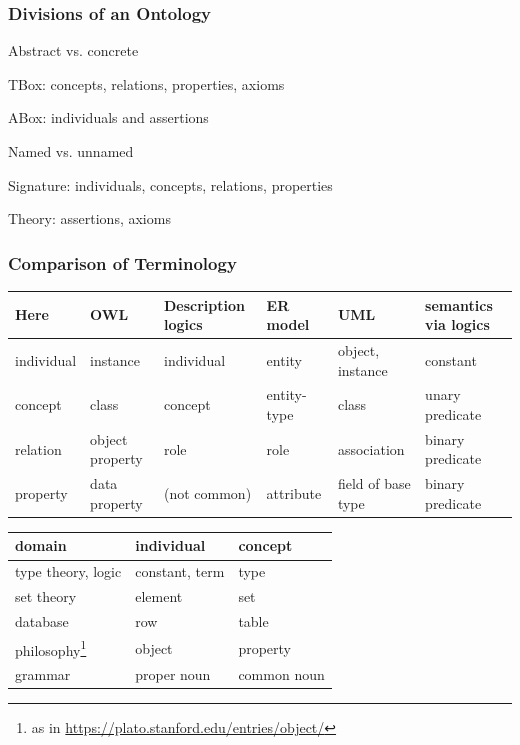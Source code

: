 \documentclass{beamer}
\begin{document}
\begin{frame}\frametitle{Divisions of an Ontology}
\begin{blockitems}{Abstract vs. concrete}
 \item TBox: concepts, relations, properties, axioms
 \item ABox: individuals and assertions
\end{blockitems}

\begin{blockitems}{Named vs. unnamed}
 \item Signature: individuals, concepts, relations, properties 
 \item Theory: assertions, axioms
\end{blockitems}
\end{frame}

\begin{frame}\frametitle{Comparison of Terminology}
\begin{center}
\tiny
\begin{tabular}{l|llll|l}
 Here       & OWL      & Description logics & ER model & UML & semantics via logics\\
\hline
 individual & instance & individual & entity & object, instance & constant\\
 concept    & class    & concept &  entity-type & class & unary predicate\\
 relation   & object property & role & role & association & binary predicate \\
 property   & data property   & (not common) & attribute & field of base type & binary predicate\\
\end{tabular}
\medskip

\begin{tabular}{l|ll}
 domain & individual & concept \\
\hline
type theory, logic & constant, term & type \\
set theory  & element & set \\
database    & row & table \\
philosophy\footnote{as in \url{https://plato.stanford.edu/entries/object/}} & object & property \\
grammar & proper noun & common noun \\
\end{tabular}
\end{center}
\end{frame}
\end{document}
